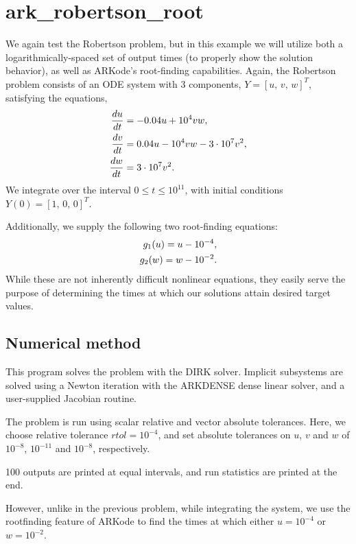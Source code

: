 \documentclass[letterpaper,10pt,english]{sphinxmanual}
\begin{document}
\section{ark\_robertson\_root}
\label{c_serial:ark-robertson-root}\label{c_serial:id13}
We again test the Robertson problem, but in this example we will
utilize both a logarithmically-spaced set of output times (to properly
show the solution behavior), as well as ARKode's root-finding
capabilities.  Again, the Robertson problem consists of an ODE system
with 3 components, \(Y = [u,\, v,\, w]^T\), satisfying the equations,
\begin{gather}
\begin{split}\frac{du}{dt} &= -0.04 u + 10^4 v w, \\
\frac{dv}{dt} &= 0.04 u - 10^4 v w - 3\cdot10^7 v^2, \\
\frac{dw}{dt} &= 3\cdot10^7 v^2.\end{split}\notag
\end{gather}
We integrate over the interval \(0\le t\le 10^{11}\), with initial
conditions  \(Y(0) = [1,\, 0,\, 0]^T\).

Additionally, we supply the following two root-finding equations:
\begin{gather}
\begin{split}g_1(u) = u - 10^{-4}, \\
g_2(w) = w - 10^{-2}.\end{split}\notag
\end{gather}
While these are not inherently difficult nonlinear equations, they
easily serve the purpose of determining the times at which our
solutions attain desired target values.


\subsection{Numerical method}
\label{c_serial:id14}
This program solves the problem with the DIRK solver.  Implicit
subsystems are solved using a Newton iteration with the ARKDENSE dense
linear solver, and a user-supplied Jacobian routine.

The problem is run using scalar relative and vector absolute
tolerances.  Here, we choose relative tolerance \(rtol=10^{-4}\),
and set absolute tolerances on \(u\), \(v\) and \(w\) of
\(10^{-8}\), \(10^{-11}\) and \(10^{-8}\), respectively.

100 outputs are printed at equal intervals, and run statistics are
printed at the end.

However, unlike in the previous problem, while integrating the system,
we use the rootfinding feature of ARKode to find the times at which
either \(u=10^{-4}\) or \(w=10^{-2}\).
\end{document}
